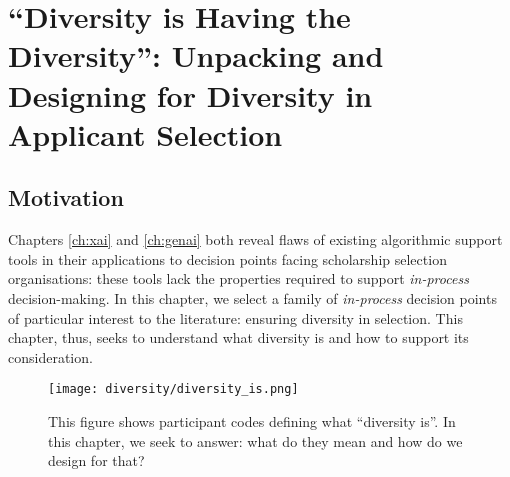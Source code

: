 \chapter{\label{ch:diversity}``Diversity is Having the Diversity'': Unpacking and Designing for Diversity in Applicant Selection}

\minitoc

\section{Motivation}
Chapters \ref{ch:xai} and \ref{ch:genai} both reveal flaws of existing algorithmic support tools in their applications to decision points facing scholarship selection organisations: these tools lack the properties required to support \emph{in-process} decision-making. In this chapter, we select a family of \emph{in-process} decision points of particular interest to the literature: ensuring diversity in selection. This chapter, thus, seeks to understand what diversity is and how to support its consideration.

\begin{figure}
    \texttt{[image: diversity/diversity\_is.png]}
    \caption{This figure shows participant codes defining what ``diversity is''. In this chapter, we seek to answer: what do they mean and how do we design for that?}
    \label{fig:diversity_is_teaser}
\end{figure}
  
